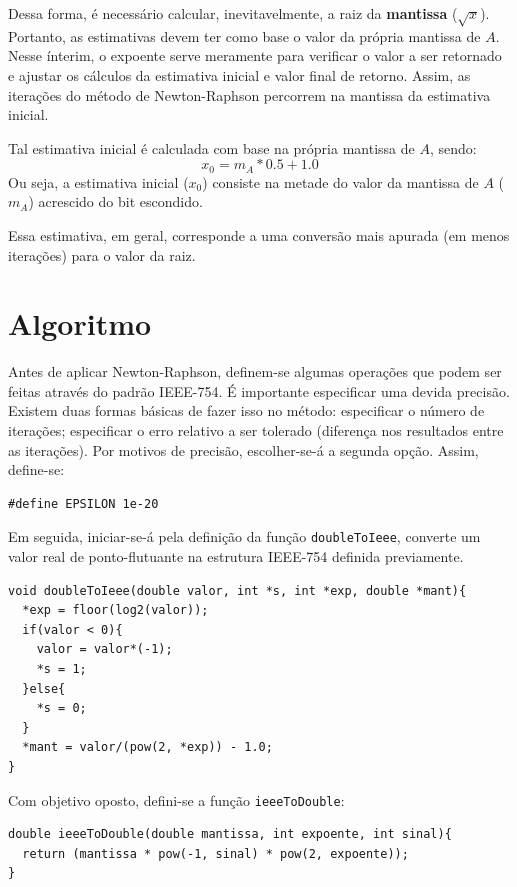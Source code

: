 	Dessa forma, é necessário calcular, inevitavelmente, a raiz da \textbf{mantissa} ($\sqrt{x}$). Portanto,
	as estimativas devem ter como base o valor da própria mantissa de $A$. Nesse ínterim, o expoente serve meramente
	para verificar o valor a ser retornado e ajustar os cálculos da estimativa inicial e valor final de retorno.
	Assim, as iterações do método de Newton-Raphson percorrem na mantissa da estimativa inicial.

	Tal estimativa inicial é calculada com base na própria mantissa de $A$, sendo:
	$$x_0 = m_A * 0.5 + 1.0$$
	Ou seja, a estimativa inicial ($x_0$) consiste na metade do valor da mantissa de $A$ ($m_A$) acrescido do bit escondido.

	Essa estimativa, em geral, corresponde a uma conversão mais apurada (em menos iterações) para o valor da raiz.

	\section{Algoritmo}

	Antes de aplicar Newton-Raphson, definem-se algumas operações que podem ser feitas através do
	padrão IEEE-754. É importante especificar uma devida precisão. Existem duas formas básicas de fazer isso no método:
	especificar o número de iterações; especificar o erro relativo a ser tolerado (diferença nos resultados entre as iterações).
	Por motivos de precisão, escolher-se-á a segunda opção. Assim, define-se:
	\begin{Verbatim}[fontsize=\footnotesize]
#define EPSILON 1e-20
	\end{Verbatim}

	Em seguida, iniciar-se-á pela definição da função \verb*|doubleToIeee|,
	converte um valor real de ponto-flutuante na estrutura IEEE-754 definida
	previamente.

	\begin{Verbatim}[fontsize=\footnotesize]
void doubleToIeee(double valor, int *s, int *exp, double *mant){
  *exp = floor(log2(valor));
  if(valor < 0){
    valor = valor*(-1);
    *s = 1;
  }else{
    *s = 0;
  }
  *mant = valor/(pow(2, *exp)) - 1.0;
}
	\end{Verbatim}

	Com objetivo oposto, defini-se a função \verb*|ieeeToDouble|:
	\begin{Verbatim}[fontsize=\footnotesize]
double ieeeToDouble(double mantissa, int expoente, int sinal){
  return (mantissa * pow(-1, sinal) * pow(2, expoente));
}
	\end{Verbatim}

